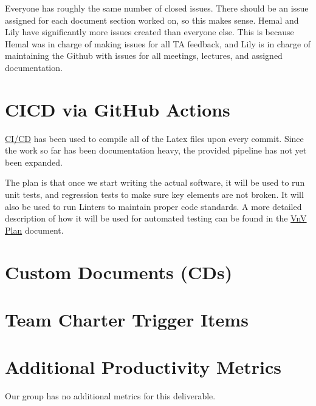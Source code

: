 \documentclass{article}
\begin{document}
Everyone has roughly the same number of closed issues. There should be 
an issue assigned for each document section worked on, so this makes sense.
Hemal and Lily have significantly more issues created than everyone else. This
is because Hemal was in charge of making issues for all TA feedback, and Lily
is in charge of maintaining the Github with issues for all meetings, lectures, 
and assigned documentation.  

\section{CICD via GitHub Actions}

\href{https://github.com/lilyporter/Ghoti/tree/main/.github/workflows}{CI/CD} has been used to compile all of the Latex files upon every commit. Since the work so far has been documentation heavy, the provided pipeline has not yet been expanded. 

The plan is that once we start writing the actual software, it will be used to run unit tests, and regression tests to make sure key elements are not broken. It will also be used to run Linters to maintain proper code standards. A more detailed description of how it will be used for automated testing can be found in the \href{https://github.com/lilyporter/Ghoti/blob/main/pdfs/VnVPlan/VnVPlan.pdf}{VnV Plan} document. 


\section{Custom Documents (CDs)}



\section{Team Charter Trigger Items}




\section{Additional Productivity Metrics}

Our group has no additional metrics for this deliverable. 
\end{document}
